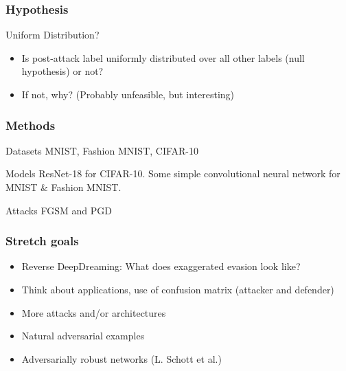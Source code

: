 \documentclass[10pt,usepdftitle=false,aspectratio=169]{beamer}
\begin{document}
\begin{frame}[fragile]
	\frametitle{Hypothesis}
			\begin{block}{Uniform Distribution?}
				\begin{itemize}
					\item Is post-attack label uniformly distributed over all other labels (null hypothesis) or not?
					\item If not, why? (Probably unfeasible, but interesting)
				\end{itemize}
			\end{block}
\end{frame}

\begin{frame}[fragile]
	\frametitle{Methods}
		\begin{block}{Datasets}
			MNIST, Fashion MNIST, CIFAR-10
		\end{block}
		\begin{block}{Models}
			ResNet-18 for CIFAR-10.
			Some simple convolutional neural network for MNIST \& Fashion MNIST.
		\end{block}
		\begin{alertblock}{Attacks}
			FGSM and PGD
		\end{alertblock}

\end{frame}

\begin{frame}[fragile]
	\frametitle{Stretch goals}
	\begin{itemize}
		\item Reverse DeepDreaming: What does exaggerated evasion look like?
		\item Think about applications, use of confusion matrix (attacker and defender)
		\item More attacks and/or architectures
		\item Natural adversarial examples
		\item Adversarially robust networks (L. Schott et al.) 
	\end{itemize}
\end{frame}
\end{document}
